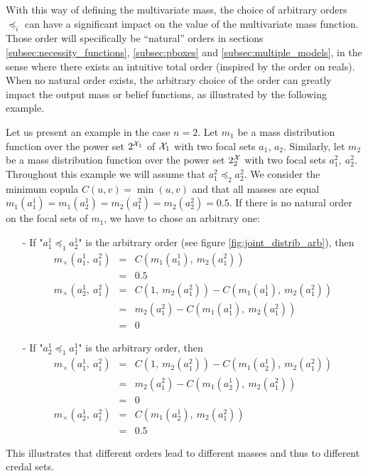 With this way of defining the multivariate mass, the choice of arbitrary orders $\preceq_i$ can have a significant impact on the value of the multivariate mass function. Those order will specifically be ``natural'' orders in sections \ref{subsec:necessity_functions}, \ref{subsec:pboxes} and \ref{subsec:multiple_models}, in the sense where there exists an intuitive total order (inspired by the order on reals). When no natural order exists, the arbitrary choice of the order can greatly impact the output mass or belief functions, as illustrated by the following example.
\begin{example}\label{ex:joint_mass}
    Let us present an example in the case $n=2$. Let $m_1$ be a mass distribution function over the power set $2^{{\mathcal{X}}_1}$ of ${\mathcal{X}}_1$ with two focal sets $a_1,\, a_2$. Similarly, let $m_2$ be a mass distribution function over the power set $2^{\mathcal{X}}_2$ with two focal sets $a_1^2,~a_2^2$. Throughout this example we will assume that $a_1^2\preceq_2a_2^2$. We consider the minimum copula $C(u,v)=\min(u,v)$ and that all masses are equal $m_1(a_1^1)=m_1(a_2^1)=m_2(a_1^2)=m_2(a_2^2)=0.5$.
    If there is no natural order on the focal sets of $m_1$, we have to chose an arbitrary one:
    \begin{itemize}
        \item[-] If "$a_1^1\preceq_1a_2^1$" is the arbitrary order (see figure \ref{fig:joint_distrib_arb}), then
        \begin{eqnarray*}
            m_\times(a_1^1,~a_1^2) &=& C(m_1(a_1^1),~m_2(a_1^2))\\
            &=& 0.5\\
            m_\times(a_2^1,~a_1^2) &=& C(1,~m_2(a_1^2)) - C(m_1(a_1^1),~m_2(a_1^2))\\
            &=& m_2(a_1^2) - C(m_1(a_1^1),~m_2(a_1^2))\\
            &=& 0
        \end{eqnarray*}
        \item[-] If "$a_2^1\preceq_1a_1^1$" is the arbitrary order, then
        \begin{eqnarray*}
            m_\times(a_1^1,~a_1^2) &=& C(1,~m_2(a_1^2)) - C(m_1(a_2^1),~m_2(a_1^2))\\
            &=& m_2(a_1^2) - C(m_1(a_2^1),~m_2(a_1^2))\\
            &=& 0\\
            m_\times(a_2^1,~a_1^2) &=& C(m_1(a_2^1),~m_2(a_1^2))\\
            &=& 0.5
        \end{eqnarray*}
    \end{itemize}
    This illustrates that different orders lead to different masses and thus to different credal sets.
    

\end{example}
